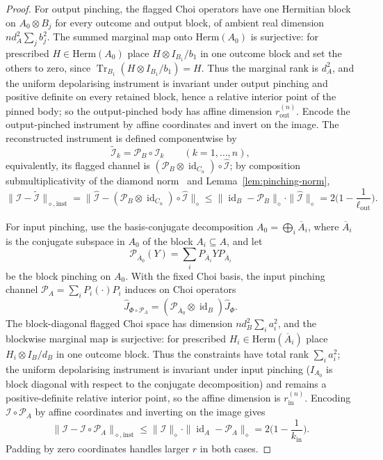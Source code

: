 \documentclass[11pt,a4paper]{article}
\newcommand{\Herm}{\mathrm{Herm}}
\newcommand{\Tr}{\operatorname{Tr}}
\newcommand{\id}{\operatorname{id}}
\newcommand{\Jhat}{\widehat J}
\begin{document}
\begin{proof}
For output pinching, the flagged Choi operators have one Hermitian block on $A_0\otimes B_j$ for every outcome and output block, of ambient real dimension $nd_A^2\sum_jb_j^2$. The summed marginal map onto $\Herm(A_0)$ is surjective: for prescribed $H\in\Herm(A_0)$ place $H\otimes I_{B_1}/b_1$ in one outcome block and set the others to zero, since $\Tr_{B_1}(H\otimes I_{B_1}/b_1)=H$. Thus the marginal rank is $d_A^2$, and the uniform depolarising instrument is invariant under output pinching and positive definite on every retained block, hence a relative interior point of the pinned body; so the output-pinched body has affine dimension $r_{\mathrm{out}}^{(n)}$. Encode the output-pinched instrument by affine coordinates and invert on the image. The reconstructed instrument is defined componentwise by
\[
\widetilde{\mathcal I}_k=\mathcal P_B\circ\mathcal I_k\qquad(k=1,\dots,n),
\]
equivalently, its flagged channel is $(\mathcal P_B\otimes\id_{C_n})\circ\widehat{\mathcal I}$; by composition submultiplicativity of the diamond norm~\cite{Watrous2018} and Lemma~\ref{lem:pinching-norm},
\[
\|\mathcal I-\widetilde{\mathcal I}\|_{\diamond,\mathrm{inst}}
=\|\widehat{\mathcal I}-(\mathcal P_B\otimes\id_{C_n})\circ\widehat{\mathcal I}\|_\diamond
\le\|\id_B-\mathcal P_B\|_\diamond\cdot\|\widehat{\mathcal I}\|_\diamond
=2\Big(1-\frac1{\ell_{\mathrm{out}}}\Big).
\]

For input pinching, use the basis-conjugate decomposition $A_0=\bigoplus_i\overline A_i$, where $\overline A_i$ is the conjugate subspace in $A_0$ of the block $A_i\subseteq A$, and let
\[
\mathcal P_{\overline A_0}(Y)=\sum_iP_{\overline A_i}YP_{\overline A_i}
\]
be the block pinching on $A_0$. With the fixed Choi basis, the input pinching channel $\mathcal P_A=\sum_iP_i(\cdot)P_i$ induces on Choi operators
\[
\Jhat_{\Phi\circ\mathcal P_A}=(\mathcal P_{\overline A_0}\otimes\id_B)\Jhat_\Phi.
\]
The block-diagonal flagged Choi space has dimension $nd_B^2\sum_ia_i^2$, and the blockwise marginal map is surjective: for prescribed $H_i\in\Herm(\overline A_i)$ place $H_i\otimes I_B/d_B$ in one outcome block. Thus the constraints have total rank $\sum_ia_i^2$; the uniform depolarising instrument is invariant under input pinching ($I_{A_0}$ is block diagonal with respect to the conjugate decomposition) and remains a positive-definite relative interior point, so the affine dimension is $r_{\mathrm{in}}^{(n)}$. Encoding $\mathcal I\circ\mathcal P_A$ by affine coordinates and inverting on the image gives
\[
\|\mathcal I-\mathcal I\circ\mathcal P_A\|_{\diamond,\mathrm{inst}}
\le\|\widehat{\mathcal I}\|_\diamond\cdot\|\id_A-\mathcal P_A\|_\diamond
=2\Big(1-\frac1{k_{\mathrm{in}}}\Big).
\]
Padding by zero coordinates handles larger $r$ in both cases.
\end{proof}
\end{document}
